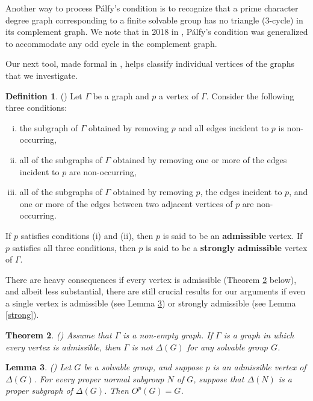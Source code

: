 \documentclass[11pt]{amsart}
\newtheorem{theorem}{Theorem}[section]
\newtheorem{lemma}[theorem]{Lemma}
\theoremstyle{definition}
\newtheorem{definition}[theorem]{Definition}
\theoremstyle{remark}
\numberwithin{equation}{section}
\begin{document}
Another way to process P\'alfy's condition is to recognize that a prime character degree graph corresponding to a finite solvable group has no triangle ($3$-cycle) in its complement graph. We note that in 2018 in \cite{A}, P\'alfy's condition was generalized to accommodate any odd cycle in the complement graph.

Our next tool, made formal in \cite{BLL2}, helps classify individual vertices of the graphs that we investigate.

\begin{definition}\label{adstrong}(\cite{BLL2})
Let $\Gamma$ be a graph and $p$ a vertex of $\Gamma$. Consider the following three conditions:
\begin{enumerate}[(i)]
    \item the subgraph of $\Gamma$ obtained by removing $p$ and all edges incident to $p$ is non-occurring,
    \item all of the subgraphs of $\Gamma$ obtained by removing one or more of the edges incident to $p$ are non-occurring,
    \item all of the subgraphs of $\Gamma$ obtained by removing $p$, the edges incident to $p$, and one or more of the edges between two adjacent vertices of $p$ are non-occurring.
\end{enumerate}
If $p$ satisfies conditions (i) and (ii), then $p$ is said to be an \textbf{admissible} vertex. If $p$ satisfies all three conditions, then $p$ is said to be a \textbf{strongly admissible} vertex of $\Gamma$.
\end{definition}

There are heavy consequences if every vertex is admissible (Theorem \ref{admissible} below), and albeit less substantial, there are still crucial results for our arguments if even a single vertex is admissible (see Lemma \ref{bigoh}) or strongly admissible (see Lemma \ref{strong}).

\begin{theorem}\label{admissible}\emph{(\cite{BLL2})}
Assume that $\Gamma$ is a non-empty graph. If $\Gamma$ is a graph in which every vertex is admissible, then $\Gamma$ is not $\Delta(G)$ for any solvable group $G$.
\end{theorem}

\begin{lemma}\label{bigoh}\emph{(\cite{BLL2})}
Let $G$ be a solvable group, and suppose $p$ is an admissible vertex of $\Delta(G)$. For every proper normal subgroup $N$ of $G$, suppose that $\Delta(N)$ is a proper subgraph of $\Delta(G)$. Then $O^p(G)=G$.
\end{lemma}
\end{document}
